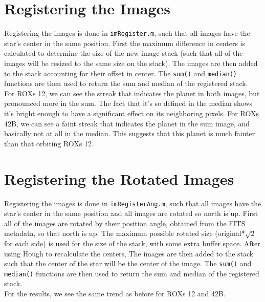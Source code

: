 \documentclass[12pt]{article}
\begin{document}
\section{Registering the Images}
Registering the images is done in \texttt{imRegister.m}, such that all images have the star's center in the same position. First the maximum difference in centers is calculated to determine the size of the new image stack (such that all of the images will be resized to the same size on the stack). The images are then added to the stack accounting for their offset in center. The \texttt{sum()} and \texttt{median()} functions are then used to return the sum and median of the registered stack.\\
\indent For ROXs 12, we can see the streak that indicates the planet in both images, but pronounced more in the sum. The fact that it's so defined in the median shows it's bright enough to have a significant effect on its neighboring pixels. For ROXs 42B, we can see a faint streak that indicates the planet in the sum image, and basically not at all in the median. This suggests that this planet is much fainter than that orbiting ROXs 12.


\section{Registering the Rotated Images}
Registering the images is done in \texttt{imRegisterAng.m}, such that all images have the star's center in the same position and all images are rotated so north is up. First all of the images are rotated by their position angle, obtained from the FITS metadata, so that north is up. The maximum possible rotated size (original*$\sqrt{2}$ for each side) is used for the size of the stack, with some extra buffer space. After using Hough to recalculate the centers, The images are then added to the stack such that the center of the star will be the center of the image. The \texttt{sum()} and \texttt{median()} functions are then used to return the sum and median of the registered stack.\\
\indent For the results, we see the same trend as before for ROXs 12 and 42B.
\end{document}

